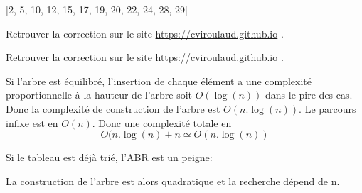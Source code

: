 \documentclass[a4paper,11pt]{article}
\begin{document}
\begin{exo}
    \begin{center}
        \label{arbre}
    \end{center}
    
    [2, 5, 10, 12, 15, 17, 19, 20, 22, 24, 28, 29]
\end{exo}
\begin{exo} Retrouver la correction sur le site \url{https://cviroulaud.github.io} .
\end{exo}
\begin{exo} Retrouver la correction sur le site \url{https://cviroulaud.github.io} .

    Si l'arbre est équilibré, l'insertion de chaque élément a une complexité proportionnelle à la hauteur de l'arbre soit $O(\log(n))$ dans le pire des cas. Donc la complexité de construction de l'arbre est $O(n.\log(n))$. Le parcours infixe est en $O(n)$. Donc une complexité totale en $$O(n.\log(n) + n \simeq O(n.\log(n))$$

    Si le tableau est déjà trié, l'ABR est un peigne:
    \begin{center}
    \end{center}
    La construction de l'arbre est alors quadratique et la recherche dépend de n.
\end{exo}
\end{document}
